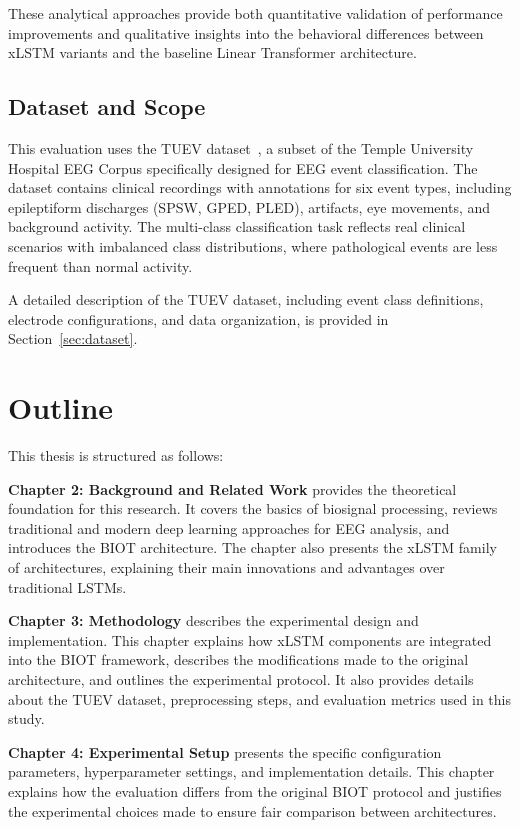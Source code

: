 These analytical approaches provide both quantitative validation of performance improvements and qualitative insights into the behavioral differences between \ac{xLSTM} variants and the baseline Linear Transformer architecture.

\subsection{Dataset and Scope}

This evaluation uses the \acf{TUEV} dataset~\cite{harati2015improved}, a subset of the Temple University Hospital \ac{EEG} Corpus specifically designed for \ac{EEG} event classification. The dataset contains clinical recordings with annotations for six event types, including epileptiform discharges (\ac{SPSW}, \ac{GPED}, \ac{PLED}), artifacts, eye movements, and background activity. The multi-class classification task reflects real clinical scenarios with imbalanced class distributions, where pathological events are less frequent than normal activity.

A detailed description of the \ac{TUEV} dataset, including event class definitions, electrode configurations, and data organization, is provided in Section~\ref{sec:dataset}.


\section{Outline}
\label{sec:introduction:outline}

This thesis is structured as follows:

\textbf{Chapter 2: Background and Related Work} provides the theoretical foundation for this research. It covers the basics of biosignal processing, reviews traditional and modern deep learning approaches for \ac{EEG} analysis, and introduces the \ac{BIOT} architecture. The chapter also presents the \ac{xLSTM} family of architectures, explaining their main innovations and advantages over traditional \acp{LSTM}.

\textbf{Chapter 3: Methodology} describes the experimental design and implementation. This chapter explains how \ac{xLSTM} components are integrated into the \ac{BIOT} framework, describes the modifications made to the original architecture, and outlines the experimental protocol. It also provides details about the \ac{TUEV} dataset, preprocessing steps, and evaluation metrics used in this study.

\textbf{Chapter 4: Experimental Setup} presents the specific configuration parameters, hyperparameter settings, and implementation details. This chapter explains how the evaluation differs from the original \ac{BIOT} protocol and justifies the experimental choices made to ensure fair comparison between architectures.

